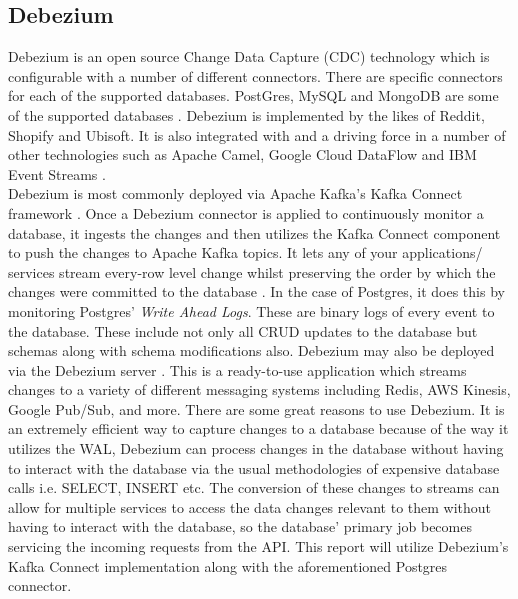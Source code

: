 \begin{flushleft}
	\subsection{Debezium}
	Debezium is an open source Change Data Capture (CDC) technology which is configurable with a number of different connectors. There are specific connectors for each of the supported databases.
	PostGres, MySQL and MongoDB are some of the supported databases \autocite{ConnectorsDebeziumDocumentation}.\newline
	Debezium is implemented by the likes of Reddit, Shopify and Ubisoft. It is also integrated with and a driving force in a number of other technologies such as
	Apache Camel, Google Cloud DataFlow and IBM Event Streams \autocite{WhoUsingDebezium}. \\
	Debezium is most commonly deployed via Apache Kafka's Kafka Connect framework \autocite{KafkaConnectConfluent}. Once a Debezium connector is applied to continuously monitor a database, it ingests the changes and then
	utilizes the Kafka Connect component to push the changes to Apache Kafka topics. It lets any of your applications/ services stream every-row level change whilst preserving the order by which
	the changes were committed to the database \autocite{debeziumcommunityDebezium}. In the case of Postgres, it does this by monitoring Postgres' \emph{Write Ahead Logs}. These are binary logs
	of every event to the database. These include not only all CRUD updates to the database but schemas along with schema modifications also.
	\bigbreak
	Debezium may also be deployed via the Debezium server \autocite{DebeziumArchitectureDebezium}. This is a ready-to-use application which streams changes to a variety of different messaging systems including Redis, AWS Kinesis, Google Pub/Sub,
	and more.
	\bigbreak
	There are some great reasons to use Debezium. It is an extremely efficient way to capture changes to a database because of the way it utilizes the WAL, Debezium can process changes in the database without having to
	interact with the database via the usual methodologies of expensive	database calls i.e. SELECT, INSERT etc. \newline
	The conversion of these changes to streams can allow for multiple services to access the data changes relevant to them without having to interact with the database, so the database' primary job
	becomes servicing the incoming requests from the API.
	\bigbreak
	This report will utilize Debezium's Kafka Connect implementation along with the aforementioned Postgres connector.

\end{flushleft}
